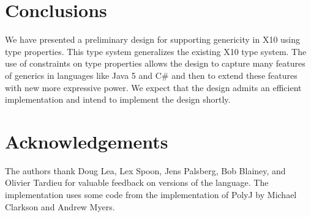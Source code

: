 \documentclass[preprint,nocopyrightspace,9pt]{sigplanconf}
\begin{document}
\section{Conclusions}

We have presented a preliminary design for supporting genericity
in X10 using type properties.  This type system generalizes the
existing X10 type system.  The use of constraints on type
properties allows
the design to capture many features of generics in languages
like Java 5 and C\# and then to extend these features with new
more expressive power.
We expect that the design admits an efficient
implementation and intend to implement the design shortly.

\section{Acknowledgements} 

The authors thank
Doug Lea, Lex Spoon, Jens Palsberg, Bob Blainey, and Olivier Tardieu
for valuable feedback on versions of the language.
The implementation uses some code from the implementation
of PolyJ by Michael Clarkson and Andrew Myers.







% 
\end{document}
